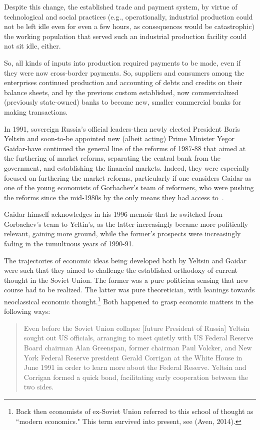 Despite this change, the established trade and payment system, by virtue of technological and social practices (e.g., operationally, industrial production could not be left idle even for even a few hours, as consequences would be catastrophic) the working population that served such an industrial production facility could not sit idle, either. 

So, all kinds of inputs into production required payments to be made, even if they were now cross-border payments. So, suppliers and consumers among the enterprises continued production and accounting of debts and credits on their balance sheets, and by the previous custom established, now commercialized (previously state-owned) banks to become new, smaller commercial banks for making transactions.

In 1991, sovereign Russia's official leaders-then newly elected President Boris Yeltsin and soon-to-be appointed new (albeit acting) Prime Minister Yegor Gaidar-have continued the general line of the reforms of 1987-88 that aimed at the furthering of market reforms, separating the central bank from the government, and establishing the financial markets. Indeed, they were especially focused on furthering the market reforms, particularly if one considers Gaidar as one of the young economists of Gorbachev's team of reformers, who were pushing the reforms since the mid-1980s by the only means they had access to~\citep[pp.~59-70]{gaidar1996}. 

Gaidar himself acknowledges in his 1996 memoir that he switched from Gorbachev's team to Yeltin's, as the latter increasingly became more politically relevant, gaining more ground, while the former's prospects were increasingly fading in the tumultuous years of 1990-91.

The trajectories of economic ideas being developed both by Yeltsin and Gaidar were such that they aimed to challenge the established orthodoxy of current thought in the Soviet Union. The former was a pure politician sensing that new course had to be realized. The latter was pure theoretician, with leanings towards neoclassical economic thought.\footnote{Back then economists of ex-Soviet Union referred to this school of thought as ``modern economics." This term survived into present, see (Aven, 2014).} Both happened to grasp economic matters in the following ways:

\begin{quote}
Even before the Soviet Union collapse [future President of Russia] Yeltsin sought out US officials, arranging to meet quietly with US Federal Reserve Board chairman Alan Greenspan, former chairman Paul Volcker, and New York Federal Reserve president Gerald Corrigan at the White House in June 1991 in order to learn more about the Federal Reserve. Yeltsin and Corrigan formed a quick bond, facilitating early cooperation between the two sides.~\citep[p.~185, emphasis added.]{johnson2019}
\end{quote}

